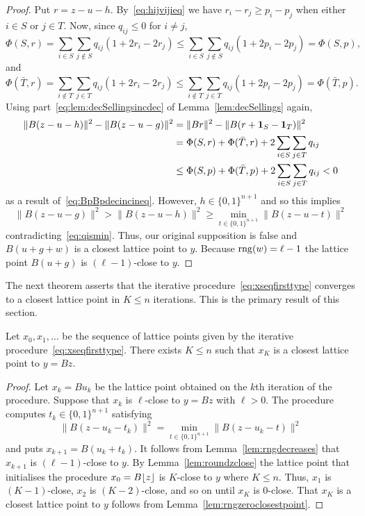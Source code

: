 \documentclass[final,leqno]{siamltex}
\begin{document}
\begin{proof}
Put $r = z - u - h$.  By~\eqref{eq:hijvijieq} we have $r_i - r_j \geq p_{i} - p_{j}$ when either $i \in S$ or $j \in T$.  Now, since $q_{ij} \leq 0$ for $i \neq j$,
\[
\Phi(S,r) = \sum_{i \in S}\sum_{j \notin S}q_{ij}(1 + 2r_i - 2r_j) \leq \sum_{i \in S}\sum_{j \notin S}q_{ij}(1 + 2p_i - 2p_j) = \Phi(S,p),
\]
and
\[
\Phi(\bar{T},r) = \sum_{i \notin T}\sum_{j \in T}q_{ij}(1 + 2r_i - 2r_j) \leq \sum_{i \notin T}\sum_{j \in T}q_{ij}(1 + 2p_i - 2p_j) = \Phi(\bar{T},p).
\]
Using part~\ref{eq:lem:decSellingsincdec} of Lemma~\ref{lem:decSellings} again,
\begin{align*}
\|B(z-u-h)\|^2 - \|B(z-u-g)\|^2 &= \|Br\|^2 - \|B(r+\boldsymbol{1}_S - \boldsymbol{1}_T)\|^2 \\
&= \Phi(S,r) + \Phi(\bar{T},r) + 2\sum_{i\in S}\sum_{j \in T} q_{ij} \\
&\leq \Phi(S,p) + \Phi(\bar{T}, p) + 2\sum_{i\in S}\sum_{j \in T} q_{ij} < 0 
\end{align*}
as a result of~\eqref{eq:BpBpdecincineq}.  However, $h \in \{0,1\}^{n+1}$ and so this implies
\[
\|B(z-u-g)\|^2 > \|B(z-u-h)\|^2 \geq \min_{t \in \{0,1\}^{n+1}}\|B(z - u - t)\|^2
\]
contradicting~\eqref{eq:qismin}.  Thus, our original supposition is false and $B(u+g+w)$ is a closest lattice point to $y$. Because $\operatorname{rng}(w) = \ell-1$ the lattice point $B(u+g)$ is $(\ell-1)$-close to $y$.
 \end{proof}

The next theorem asserts that the iterative procedure~\eqref{eq:xseqfirsttype} converges to a closest lattice point in $K \leq n$ iterations.  This is the primary result of this section.

\begin{theorem}
Let $x_0,x_1,\dots$ be the sequence of lattice points given by the iterative procedure~\eqref{eq:xseqfirsttype}.  There exists $K \leq n$ such that $x_K$ is a closest lattice point to $y = Bz$.
\end{theorem}
\begin{proof}
Let $x_k = B u_k$ be the lattice point obtained on the $k$th iteration of the procedure.  Suppose that $x_k$ is $\ell$-close to $y=Bz$ with $\ell > 0$.  The procedure computes $t_{k} \in \{0,1\}^{n+1}$ satisfying
\[
\|B(z - u_k - t_{k})\|^2 = \min_{t \in \{0,1\}^{n+1}}\|B(z - u_k - t)\|^2
\]
and puts $x_{k+1} = B(u_k + t_k)$.  It follows from Lemma~\ref{lem:rngdecreases} that $x_{k+1}$ is $(\ell-1)$-close to $y$.  By Lemma~\ref{lem:roundzclose} the lattice point that initialises the procedure $x_0 = B {\left\lfloor z \right\rfloor}$ is $K$-close to $y$ where $K \leq n$.  Thus, $x_1$ is $(K-1)$-close, $x_2$ is $(K-2)$-close, and so on until $x_K$ is $0$-close.  That $x_K$ is a closest lattice point to $y$ follows from Lemma~\ref{lem:rngzeroclosestpoint}.
\end{proof}
\end{document}
